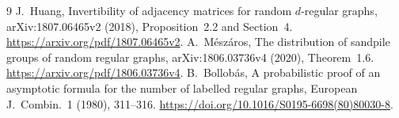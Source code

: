 \documentclass[11pt]{article}
\begin{document}
\begin{thebibliography}{9}
 J.~Huang, Invertibility of adjacency matrices for random
$d$-regular graphs, arXiv:1807.06465v2 (2018), Proposition~2.2 and
Section~4. \url{https://arxiv.org/pdf/1807.06465v2}.
 A.~M\'esz\'aros, The distribution of sandpile groups
of random regular graphs, arXiv:1806.03736v4 (2020), Theorem~1.6.
\url{https://arxiv.org/pdf/1806.03736v4}.
 B.~Bollob\'as, A probabilistic proof of an asymptotic
formula for the number of labelled regular graphs, European
J.~Combin.~1 (1980), 311--316.
\url{https://doi.org/10.1016/S0195-6698(80)80030-8}.
\end{thebibliography}
\end{document}
